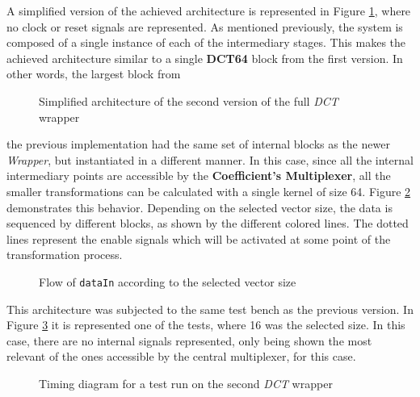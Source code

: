 A simplified version of the achieved architecture is represented in Figure \ref{fig:fullv2}, where no clock or reset signals are represented. As mentioned previously, the system is composed of a single instance of each of the intermediary stages. This makes the achieved architecture similar to a single \textbf{DCT64} block from the first version. In other words, the largest block from

\begin{landscape}
    \vspace*{\fill}
    \begin{figure}[!htbp]
        \centering
        
        \caption{Simplified architecture of the second version of the full \emph{DCT} wrapper}
        \label{fig:fullv2}
    \end{figure}
    \vspace*{\fill}        
\end{landscape}

\noindent
the previous implementation had the same set of internal blocks as the newer \emph{Wrapper}, but instantiated in a different manner. In this case, since all the internal intermediary points are accessible by the \textbf{Coefficient's Multiplexer}, all the smaller transformations can be calculated with a single kernel of size 64. Figure \ref{fig:v2datapath} demonstrates this behavior. Depending on the selected vector size, the data is sequenced by different blocks, as shown by the different colored lines. The dotted lines represent the enable signals which will be activated at some point of the transformation process.

\begin{figure}[!htbp]
    \centering
    
    \caption{Flow of \texttt{dataIn} according to the selected vector size}
    \label{fig:v2datapath}
\end{figure}

This architecture was subjected to the same test bench as the previous version. In Figure \ref{fig:v2timing} it is represented one of the tests, where 16 was the selected size. In this case, there are no internal signals represented, only being shown the most relevant of the ones accessible by the central multiplexer, for this case. 

\begin{figure}[!htbp]
    \centering
    
    \caption{Timing diagram for a test run on the second \emph{DCT} wrapper}
    \label{fig:v2timing}
\end{figure}

